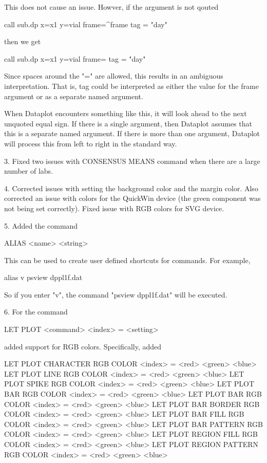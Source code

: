         This does not cause an issue.  Howver, if the argument is not
        qouted

            call sub.dp   x=x1  y=vial  frame=^frame tag = "day"

        then we get

            call sub.dp   x=x1  y=vial  frame=  tag = "day"

        Since spaces around the "=" are allowed, this results in an
        ambiguous interpretation.  That is, tag could be interpreted
        as either the value for the frame argument or as a separate
        named argument.

        When Dataplot encounters something like this, it will look
        ahead to the next unquoted equal sign.  If there is a single
        argument, then Dataplot assumes that this is a separate named
        argument.  If there is more than one argument, Dataplot will
        process this from left to right in the standard way.

 3. Fixed two issues with CONSENSUS MEANS command when there are a large
    number of labs.

 4. Corrected issues with setting the background color and the margin
    color.  Also corrected an issue with colors for the QuickWin device
    (the green component was not being set correctly).  Fixed issue with
    RGB colors for SVG device.

 5. Added the command

        ALIAS  <name>  <string>

    This can be used to create user defined shortcuts for commands.
    For example,

        alias v  psview dppl1f.dat

    So if you enter "v", the command "psview dppl1f.dat" will be
    executed.

 6. For the command

        LET PLOT <command> <index> = <setting>

    added support for RGB colors.  Specifically, added

        LET PLOT CHARACTER       RGB COLOR <index> = <red> <green> <blue>
        LET PLOT LINE            RGB COLOR <index> = <red> <green> <blue>
        LET PLOT SPIKE           RGB COLOR <index> = <red> <green> <blue>
        LET PLOT BAR             RGB COLOR <index> = <red> <green> <blue>
        LET PLOT BAR             RGB COLOR <index> = <red> <green> <blue>
        LET PLOT BAR BORDER      RGB COLOR <index> = <red> <green> <blue>
        LET PLOT BAR FILL        RGB COLOR <index> = <red> <green> <blue>
        LET PLOT BAR PATTERN     RGB COLOR <index> = <red> <green> <blue>
        LET PLOT REGION FILL     RGB COLOR <index> = <red> <green> <blue>
        LET PLOT REGION PATTERN  RGB COLOR <index> = <red> <green> <blue>

